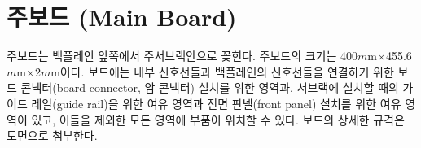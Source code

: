 \section{주보드 (Main Board)}
주보드는 백플레인 앞쪽에서 주서브랙안으로 꽂힌다.
주보드의 크기는
400$m$m$\times$455.6$m$m$\times$2$m$m이다.
보드에는 내부 신호선들과 백플레인의 신호선들을 연결하기 위한 보드 콘넥터(board connector, 암 콘넥터)
설치를 위한 영역과, 서브랙에 설치할 때의 가이드 레일(guide rail)을
위한 여유 영역과 전면 판넬(front panel) 설치를 위한 여유 영역이 있고,
이들을 제외한 모든 영역에 부품이 위치할 수 있다. 보드의 상세한 규격은 도면으로 첨부한다.
%

